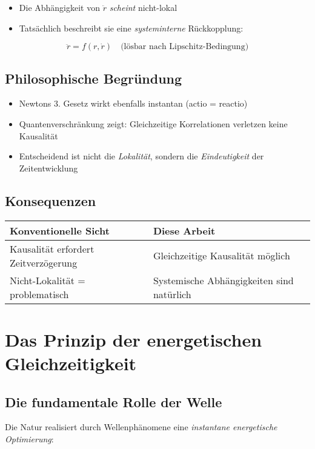 \begin{itemize}
    \item Die Abhängigkeit von $\ddot{r}$ \textit{scheint} nicht-lokal
    \item Tatsächlich beschreibt sie eine \textit{systeminterne} Rückkopplung:
\end{itemize}

\begin{equation}
    \ddot{r} = f(r, \dot{r}) \quad \text{(lösbar nach Lipschitz-Bedingung)}
\end{equation}

\subsection{Philosophische Begründung}
\begin{itemize}
    \item Newtons 3. Gesetz wirkt ebenfalls instantan (actio = reactio)
    \item Quantenverschränkung zeigt: Gleichzeitige Korrelationen verletzen keine Kausalität
    \item Entscheidend ist nicht die \textit{Lokalität}, sondern die \textit{Eindeutigkeit} der Zeitentwicklung
\end{itemize}

\subsection{Konsequenzen}
\begin{tabular}{p{}p{}}
    \hline
    \textbf{Konventionelle Sicht} & \textbf{Diese Arbeit} \\
    \hline
    Kausalität erfordert Zeitverzögerung & Gleichzeitige Kausalität möglich \\
    Nicht-Lokalität = problematisch & Systemische Abhängigkeiten sind natürlich \\
    \hline
\end{tabular}

\section{Das Prinzip der energetischen Gleichzeitigkeit}
\label{sec:energetische_gleichzeitigkeit}

\subsection{Die fundamentale Rolle der Welle}
Die Natur realisiert durch Wellenphänomene eine \emph{instantane energetische Optimierung}:

